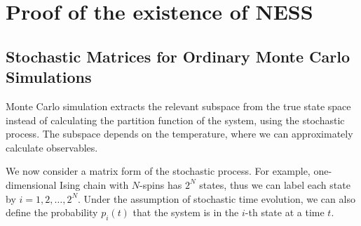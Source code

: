 
\chapter{Proof of the existence of NESS}
\label{chap:ProofEx}

\section{Stochastic Matrices for Ordinary Monte Carlo Simulations}

Monte Carlo simulation extracts the relevant subspace from the true state space instead of calculating the partition function of the system, using the stochastic process. The subspace depends on the temperature, where we can approximately calculate observables.

We now consider a matrix form of the stochastic process. For example, one-dimensional Ising chain with $N$-spins has $2^{N}$ states, thus we can label each state by $i=1,2,\dots,2^{N}$. Under the assumption of stochastic time evolution, we can also define the probability $p_{i}(t)$ that the system is in the $i$-th state at a time $t$.

